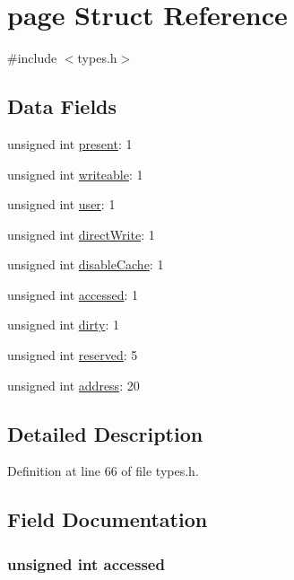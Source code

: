 \hypertarget{structpage}{
\section{page Struct Reference}
\label{structpage}
}


{\ttfamily \#include $<$types.h$>$}

\subsection*{Data Fields}
\begin{DoxyCompactItemize}
\item 
unsigned int \hyperlink{structpage_abc4c133346e4b24e2e71fe80ffc39a6f}{present}: 1
\item 
unsigned int \hyperlink{structpage_a053ea5deda2f64604e4541bf626bef9c}{writeable}: 1
\item 
unsigned int \hyperlink{structpage_aaf4a05f547280bd4819e5df8c4523cd1}{user}: 1
\item 
unsigned int \hyperlink{structpage_a8bcb7dbeb8dba19debc9a4a062f8a6bc}{directWrite}: 1
\item 
unsigned int \hyperlink{structpage_afed734c6ffccf36d8318903bfe4e4e1b}{disableCache}: 1
\item 
unsigned int \hyperlink{structpage_ad9199508706a6aaec358e5200bb389c7}{accessed}: 1
\item 
unsigned int \hyperlink{structpage_a930a1ab0130f619f847727300b9d156a}{dirty}: 1
\item 
unsigned int \hyperlink{structpage_a05d5cbcb44f437341bd9fa37d589aced}{reserved}: 5
\item 
unsigned int \hyperlink{structpage_a2f55ff1f6cd45ca1b6431493ab5614eb}{address}: 20
\end{DoxyCompactItemize}


\subsection{Detailed Description}


Definition at line 66 of file types.h.



\subsection{Field Documentation}
\hypertarget{structpage_ad9199508706a6aaec358e5200bb389c7}{
\subsubsection[{accessed}]{\setlength{\rightskip}{0pt plus 5cm}unsigned int {\bf accessed}}}
\label{structpage_ad9199508706a6aaec358e5200bb389c7}


